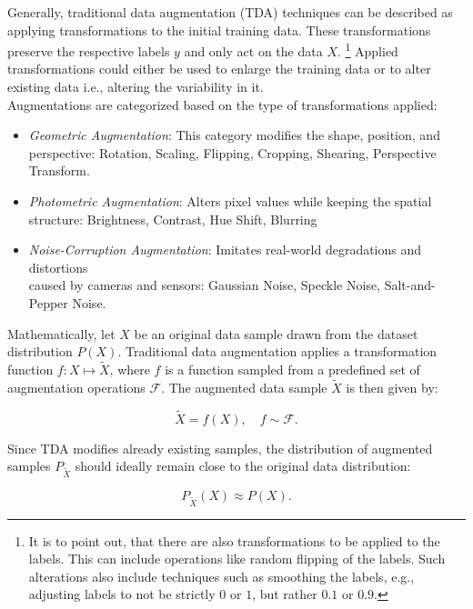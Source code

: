 
Generally, traditional data augmentation (TDA) techniques can be described as applying transformations to the initial training data. These transformations preserve the respective labels \(y\) and only act on the data \(X\). \footnote{It is to point out, that there are also transformations to be applied to the labels. This can include operations like random flipping of the labels. Such alterations also include techniques such as smoothing the labels, e.g., adjusting labels to not be strictly $0$ or $1$, but rather $0.1$ or $0.9$.} Applied transformations could either be used to enlarge the training data or to alter existing data i.e., altering the variability in it.\\

Augmentations are categorized based on the type of transformations applied:

\begin{itemize}
    \item \textit{Geometric Augmentation}: This category modifies the shape, position, and perspective: Rotation, Scaling, Flipping, Cropping, Shearing, Perspective Transform.
    \item \textit{Photometric Augmentation}: Alters pixel values while keeping the spatial structure: Brightness, Contrast, Hue Shift, Blurring
    \item \textit{Noise-Corruption Augmentation}: Imitates real-world degradations and distortions \\caused by cameras and sensors: Gaussian Noise, Speckle Noise, Salt-and-Pepper Noise.
\end{itemize}

\noindent
Mathematically, let \( X \) be an original data sample drawn from the dataset distribution \( P(X) \). Traditional data augmentation applies a transformation function \( f: X \mapsto \tilde{X} \), where \( f \) is a function sampled from a predefined set of augmentation operations \( \mathcal{F} \). The augmented data sample \( \tilde{X} \) is then given by:

\[
\tilde{X} = f(X), \quad f \sim \mathcal{F}.
\]

\noindent
Since TDA modifies already existing samples, the distribution of augmented samples \( P_{\tilde{X}} \) should ideally remain close to the original data distribution:

\[
P_{\tilde{X}}(X) \approx P(X).
\]

